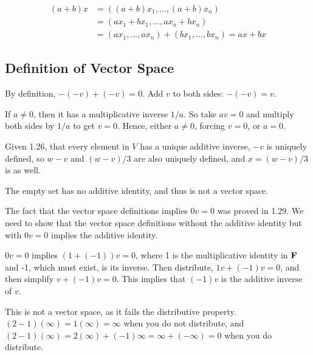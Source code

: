 \documentclass{article}
\begin{document}

\begin{align*}
(a+b)x & = ((a+b)x_1, \ldots, (a+b)x_n) \\
       & = (ax_1 + bx_1, \ldots, ax_n + bx_n) \\
       & = (ax_1, \ldots, ax_n) + (bx_1, \ldots, bx_n) = ax + bx
\end{align*}

\subsection{Definition of Vector Space}


By definition, $-(-v) + (-v) = 0$. Add $v$ to both sides: $-(-v) = v$.


If $a \neq 0$, then it has a multiplicative inverse $1/a$. So take $av = 0$
and multiply both sides by $1/a$ to get $v = 0$. Hence, either $a \neq 0$,
forcing $v = 0$, or $a = 0$.


Given 1.26, that every element in $V$ has a unique additive inverse, $-v$ is
uniquely defined, so $w - v$ and $(w - v)/3$ are also uniquely defined, and $x =
(w - v)/3$ is as well.


The empty set has no additive identity, and thus is not a vector space.


The fact that the vector space definitions implies $0v = 0$ was proved in 1.29.
We need to show that the vector space definitions without the additive identity
but with $0v = 0$ implies the additive identity.

$0v = 0$ implies $(1 + (-1))v = 0$, where 1 is the multiplicative identity in
$\mathbf{F}$ and -1, which must exist, is its inverse. Then distribute, $1v + (-1)v =
0$, and then simplify $v + (-1)v = 0$. This implies that $(-1)v$ is the additive
inverse of $v$.


This is not a vector space, as it fails the distributive property. $(2 -
1)(\infty) = 1(\infty) = \infty$ when you do not distribute, and $(2 -
1)(\infty) = 2(\infty) + (-1)\infty = \infty + (-\infty) = 0$ when you do
distribute.
\end{document}
